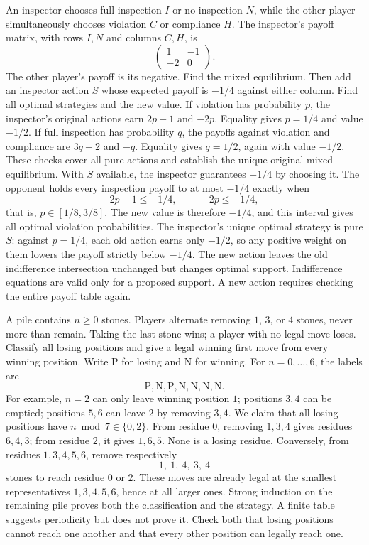 An inspector chooses full inspection $I$ or no inspection $N$, while the other player simultaneously chooses violation $C$ or compliance $H$. The inspector's payoff matrix, with rows $I,N$ and columns $C,H$, is
\[
 \begin{pmatrix}1&-1\\-2&0\end{pmatrix}.
\]
The other player's payoff is its negative. Find the mixed equilibrium. Then add an inspector action $S$ whose expected payoff is $-1/4$ against either column. Find all optimal strategies and the new value.
\solution If violation has probability $p$, the inspector's original actions earn $2p-1$ and $-2p$. Equality gives $p=1/4$ and value $-1/2$. If full inspection has probability $q$, the payoffs against violation and compliance are $3q-2$ and $-q$. Equality gives $q=1/2$, again with value $-1/2$. These checks cover all pure actions and establish the unique original mixed equilibrium.
With $S$ available, the inspector guarantees $-1/4$ by choosing it. The opponent holds every inspection payoff to at most $-1/4$ exactly when
\[
 2p-1\le-1/4,\qquad -2p\le-1/4,
\]
that is, $p\in[1/8,3/8]$. The new value is therefore $-1/4$, and this interval gives all optimal violation probabilities.
The inspector's unique optimal strategy is pure $S$: against $p=1/4$, each old action earns only $-1/2$, so any positive weight on them lowers the payoff strictly below $-1/4$. The new action leaves the old indifference intersection unchanged but changes optimal support.
\insight Indifference equations are valid only for a proposed support. A new action requires checking the entire payoff table again.

A pile contains $n\ge0$ stones. Players alternate removing $1$, $3$, or $4$ stones, never more than remain. Taking the last stone wins; a player with no legal move loses. Classify all losing positions and give a legal winning first move from every winning position.
\solution Write P for losing and N for winning. For $n=0,\ldots,6$, the labels are
\[
 \mathrm{P,N,P,N,N,N,N}.
\]
For example, $n=2$ can only leave winning position $1$; positions $3,4$ can be emptied; positions $5,6$ can leave $2$ by removing $3,4$.
We claim that all losing positions have $n\bmod7\in\{0,2\}$. From residue $0$, removing $1,3,4$ gives residues $6,4,3$; from residue $2$, it gives $1,6,5$. None is a losing residue. Conversely, from residues $1,3,4,5,6$, remove respectively
\[
 1,\ 1,\ 4,\ 3,\ 4
\]
stones to reach residue $0$ or $2$. These moves are already legal at the smallest representatives $1,3,4,5,6$, hence at all larger ones. Strong induction on the remaining pile proves both the classification and the strategy.
\insight A finite table suggests periodicity but does not prove it. Check both that losing positions cannot reach one another and that every other position can legally reach one.

